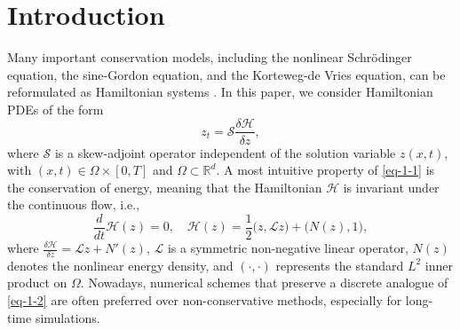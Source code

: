 \documentclass[onefignum,onetabnum]{siamart}
\begin{document}
\section{Introduction}\label{sec:introduction}
Many important conservation models, including the nonlinear Schr\"odinger equation, the sine-Gordon equation, and the Korteweg-de Vries equation, can be reformulated as Hamiltonian systems \cite{leimkuhler-04-SHD}. In this paper, we consider Hamiltonian PDEs of the form
\begin{equation}\label{eq-1-1}
	z_t=\mathcal{S}\frac{\delta\mathcal{H}}{\delta z},
\end{equation}
where $\mathcal{S}$ is a skew-adjoint operator independent of the solution variable $z(x,t)$, with $(x,t)\in\Omega\times [0,T]$ and $\Omega\subset\mathbb{R}^d$. A most intuitive property of \eqref{eq-1-1} is the conservation of energy, meaning that the Hamiltonian $\mathcal{H}$ is invariant under the continuous flow, i.e.,
\begin{equation}\label{eq-1-2}
	\frac{d}{dt}\mathcal{H}(z)=0,\quad\mathcal{H}(z)=\frac{1}{2}\big(z,\mathcal{L}z\big) +\big(N(z),1\big),
\end{equation}
where $\frac{\delta\mathcal{H}}{\delta z}=\mathcal{L}z+N'(z)$, $\mathcal{L}$ is a symmetric non-negative linear operator, $N(z)$ denotes the nonlinear energy density, and $(\cdot, \cdot)$ represents the standard $L^2$ inner product on $\Omega$. Nowadays, numerical schemes that preserve a discrete analogue of \eqref{eq-1-2} are often preferred over non-conservative methods, especially for long-time simulations.
\end{document}
